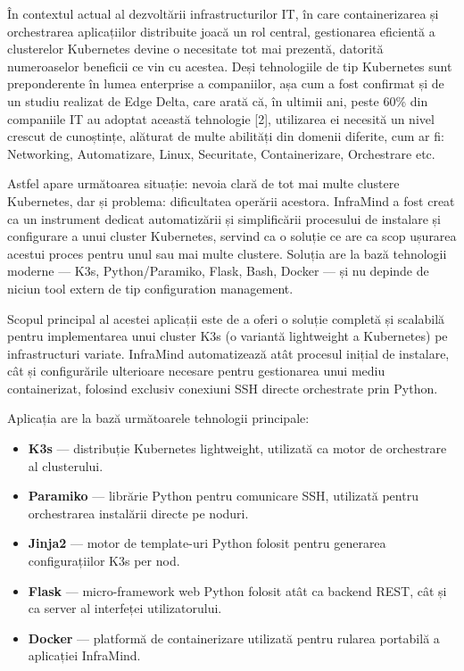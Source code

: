 \documentclass[12pt,a4paper]{report}
\begin{document}
\noindent În contextul actual al dezvoltării infrastructurilor IT, în care containerizarea și orchestrarea aplicațiilor distribuite joacă un rol central, gestionarea eficientă a clusterelor Kubernetes devine o necesitate tot mai prezentă, datorită numeroaselor beneficii ce vin cu acestea. Deși tehnologiile de tip Kubernetes sunt preponderente în lumea enterprise a companiilor, așa cum a fost confirmat și de un studiu realizat de Edge Delta, care arată că, în ultimii ani, peste 60\% din companiile IT au adoptat această tehnologie [2], utilizarea ei necesită un nivel crescut de cunoștințe, alăturat de multe abilități din domenii diferite, cum ar fi: Networking, Automatizare, Linux, Securitate, Containerizare, Orchestrare etc.

Astfel apare următoarea situație: nevoia clară de tot mai multe clustere Kubernetes, dar și problema: dificultatea operării acestora. InfraMind a fost creat ca un instrument dedicat automatizării și simplificării procesului de instalare și configurare a unui cluster Kubernetes, servind ca o soluție ce are ca scop ușurarea acestui proces pentru unul sau mai multe clustere. Soluția are la bază tehnologii moderne — K3s, Python/Paramiko, Flask, Bash, Docker — și nu depinde de niciun tool extern de tip configuration management.

Scopul principal al acestei aplicații este de a oferi o soluție completă și scalabilă pentru implementarea unui cluster K3s (o variantă lightweight a Kubernetes) pe infrastructuri variate. InfraMind automatizează atât procesul inițial de instalare, cât și configurările ulterioare necesare pentru gestionarea unui mediu containerizat, folosind exclusiv conexiuni SSH directe orchestrate prin Python.

Aplicația are la bază următoarele tehnologii principale:

\begin{itemize}
  \item \textbf{K3s} — distribuție Kubernetes lightweight, utilizată ca motor de orchestrare al clusterului.
  \item \textbf{Paramiko} — librărie Python pentru comunicare SSH, utilizată pentru orchestrarea instalării directe pe noduri.
  \item \textbf{Jinja2} — motor de template-uri Python folosit pentru generarea configurațiilor K3s per nod.
  \item \textbf{Flask} — micro-framework web Python folosit atât ca backend REST, cât și ca server al interfeței utilizatorului.
  \item \textbf{Docker} — platformă de containerizare utilizată pentru rularea portabilă a aplicației InfraMind.
\end{itemize}
\end{document}
